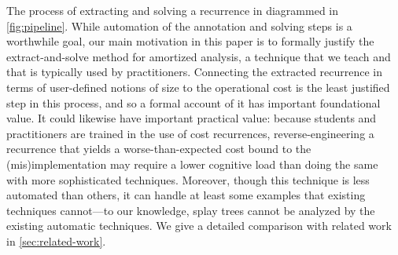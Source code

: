 The process of extracting and solving a recurrence in diagrammed in
\autoref{fig:pipeline}.
While automation of the annotation and solving steps
is a worthwhile goal,
our
main motivation in this paper is to formally justify the
extract-and-solve method for amortized analysis, a technique that we teach and that is
typically used by practitioners.  Connecting the extracted recurrence in
terms of user-defined notions of size to the operational cost is the
least justified step in this process, and so a formal account of it has
important foundational value.  It could likewise have important
practical value: because students and practitioners are trained in the
use of cost recurrences, reverse-engineering a recurrence that yields a
worse-than-expected cost bound to the (mis)implementation may require
a lower cognitive load than doing the same with more
sophisticated techniques.  Moreover, though this technique is less
automated than others, it can handle at least some examples that
existing techniques cannot---to our knowledge, splay trees cannot be
analyzed by the existing automatic techniques.
We give a detailed comparison with related work in \autoref{sec:related-work}.



